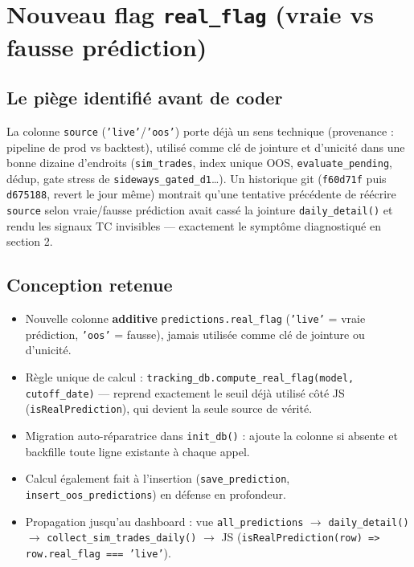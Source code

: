 \documentclass[11pt]{article}
\begin{document}
\section{Nouveau flag \texttt{real\_flag} (vraie vs fausse prédiction)}

\subsection{Le piège identifié avant de coder}
La colonne \texttt{source} (\texttt{'live'}/\texttt{'oos'}) porte déjà un sens
technique (provenance : pipeline de prod vs backtest), utilisé comme clé de
jointure et d'unicité dans une bonne dizaine d'endroits (\texttt{sim\_trades},
index unique OOS, \texttt{evaluate\_pending}, dédup, gate stress de
\texttt{sideways\_gated\_d1}\ldots). Un historique git (\texttt{f60d71f} puis
\texttt{d675188}, revert le jour même) montrait qu'une tentative précédente de
réécrire \texttt{source} selon vraie/fausse prédiction avait cassé la jointure
\texttt{daily\_detail()} et rendu les signaux TC invisibles --- exactement le
symptôme diagnostiqué en section 2.

\subsection{Conception retenue}
\begin{itemize}
  \item Nouvelle colonne \textbf{additive} \texttt{predictions.real\_flag}
        (\texttt{'live'} = vraie prédiction, \texttt{'oos'} = fausse), jamais
        utilisée comme clé de jointure ou d'unicité.
  \item Règle unique de calcul : \texttt{tracking\_db.compute\_real\_flag(model,
        cutoff\_date)} --- reprend exactement le seuil déjà utilisé côté JS
        (\texttt{isRealPrediction}), qui devient la seule source de vérité.
  \item Migration auto-réparatrice dans \texttt{init\_db()} : ajoute la colonne
        si absente et backfille toute ligne existante à chaque appel.
  \item Calcul également fait à l'insertion (\texttt{save\_prediction},
        \texttt{insert\_oos\_predictions}) en défense en profondeur.
  \item Propagation jusqu'au dashboard : vue \texttt{all\_predictions}
        $\rightarrow$ \texttt{daily\_detail()} $\rightarrow$
        \texttt{collect\_sim\_trades\_daily()} $\rightarrow$ JS
        (\texttt{isRealPrediction(row) => row.real\_flag === 'live'}).
\end{itemize}
\end{document}
